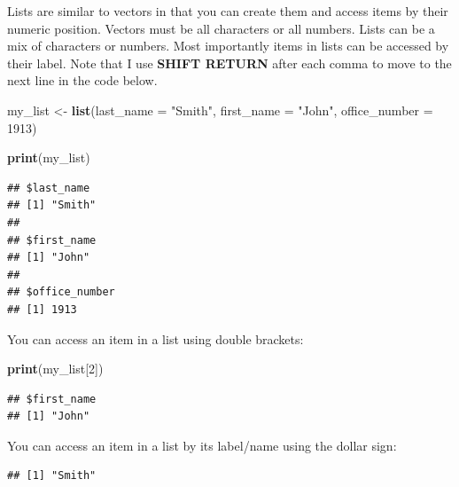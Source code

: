 \documentclass[
]{krantz}
\makeatletter
\newenvironment{Shaded}{\begin{snugshade}}{\end{snugshade}}
\newcommand{\DataTypeTok}[1]{\textcolor[rgb]{0.27,0.27,0.27}{#1}}
\newcommand{\DecValTok}[1]{\textcolor[rgb]{0.06,0.06,0.06}{#1}}
\newcommand{\KeywordTok}[1]{\textcolor[rgb]{0.27,0.27,0.27}{\textbf{#1}}}
\newcommand{\NormalTok}[1]{#1}
\newcommand{\OperatorTok}[1]{\textcolor[rgb]{0.43,0.43,0.43}{\textbf{#1}}}
\newcommand{\StringTok}[1]{\textcolor[rgb]{0.5,0.5,0.5}{#1}}
\newenvironment{kframe}{%
\medskip{}
\setlength{\fboxsep}{.8em}
 \def\at@end@of@kframe{}%
 \ifinner\ifhmode%
  \def\at@end@of@kframe{\end{minipage}}%
  \begin{minipage}{\columnwidth}%
 \fi\fi%
 \def\FrameCommand##1{\hskip\@totalleftmargin \hskip-\fboxsep
 \colorbox{shadecolor}{##1}\hskip-\fboxsep
     \hskip-\linewidth \hskip-\@totalleftmargin \hskip\columnwidth}%
 \MakeFramed {\advance\hsize-\width
   \@totalleftmargin\z@ \linewidth\hsize
   \@setminipage}}%
 {\par\unskip\endMakeFramed%
 \at@end@of@kframe}
\renewenvironment{Shaded}{\begin{kframe}}{\end{kframe}}
\makeatother
\begin{document}
Lists are similar to vectors in that you can create them and access items by their numeric position. Vectors must be all characters or all numbers. Lists can be a mix of characters or numbers. Most importantly items in lists can be accessed by their label. Note that I use \textbf{SHIFT RETURN} after each comma to move to the next line in the code below.

\begin{Shaded}
\begin{Highlighting}[]
\NormalTok{my_list <-}\StringTok{ }\KeywordTok{list}\NormalTok{(}\DataTypeTok{last_name =} \StringTok{"Smith"}\NormalTok{,}
                \DataTypeTok{first_name =} \StringTok{"John"}\NormalTok{,}
                \DataTypeTok{office_number =} \DecValTok{1913}\NormalTok{)}

\KeywordTok{print}\NormalTok{(my_list)}
\end{Highlighting}
\end{Shaded}

\begin{verbatim}
## $last_name
## [1] "Smith"
## 
## $first_name
## [1] "John"
## 
## $office_number
## [1] 1913
\end{verbatim}

You can access an item in a list using double brackets:

\begin{Shaded}
\begin{Highlighting}[]
\KeywordTok{print}\NormalTok{(my_list[}\DecValTok{2}\NormalTok{])}
\end{Highlighting}
\end{Shaded}

\begin{verbatim}
## $first_name
## [1] "John"
\end{verbatim}

You can access an item in a list by its label/name using the dollar sign:

\begin{Shaded}
\end{Shaded}

\begin{verbatim}
## [1] "Smith"
\end{verbatim}

\begin{Shaded}
\end{Shaded}
\end{document}
